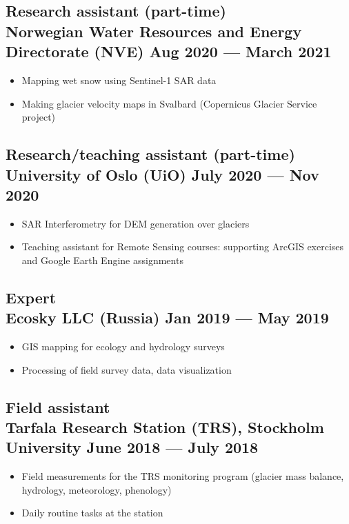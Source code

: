\documentclass[a4,10pt]{article}
\newenvironment{zitemize}{
\begin{itemize}\itemsep2pt \parskip0pt \parsep1pt}
{\end{itemize}\vspace{-0.5cm}}
\begin{document}
\subsection*{Research assistant (part-time) \\ Norwegian Water Resources and Energy Directorate (NVE) \hfill Aug 2020 --- March 2021} 
    \begin{zitemize}
        \item Mapping wet snow using Sentinel-1 SAR data
        \item Making glacier velocity maps in Svalbard (Copernicus Glacier Service project)
    \end{zitemize}

    
\subsection*{Research/teaching assistant (part-time) \\University of Oslo (UiO) \hfill July 2020 --- Nov 2020} 
    \begin{zitemize}
        \item SAR Interferometry for DEM generation over glaciers 
        \item Teaching assistant for Remote Sensing courses: supporting ArcGIS exercises and Google Earth Engine assignments
    \end{zitemize}  
    
\subsection*{Expert \\Ecosky LLC (Russia) \hfill Jan 2019 --- May 2019} 
    \begin{zitemize}
        \item GIS mapping for ecology and hydrology surveys
        \item Processing of field survey data, data visualization
    \end{zitemize}  
    
\subsection*{Field assistant \\Tarfala Research Station (TRS), Stockholm University \hfill June 2018 --- July 2018} 
    \begin{zitemize}
        \item Field measurements for the TRS monitoring program (glacier mass balance, hydrology, meteorology, phenology)
        \item Daily routine tasks at the station
    \end{zitemize}  
\end{document}
